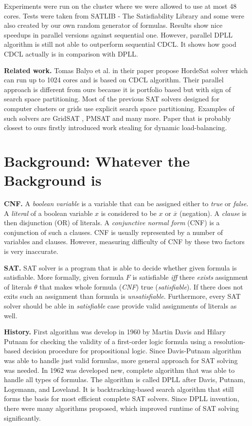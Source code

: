 \documentclass[letterpaper]{article}
\newcommand{\mypar}[1]{{\bf #1.}}
\begin{document}
Experiments were run on the cluster where we were allowed to use at most 48 cores. Tests were taken from SATLIB - The Satisfiability Library \cite{cnf_website} and some were also created by our own random generator of formulas. Results show nice speedups in parallel versions against sequential one. However, parallel DPLL algorithm is still not able to outperform sequential CDCL. It shows how good CDCL actually is in comparison with DPLL. 

\mypar{Related work} Tomas Balyo et al. in their paper \cite{hordesat} propose HordeSat solver which can run up to 1024 cores and is based on CDCL algorithm. Their parallel approach is different from ours because it is portfolio based but with sign of search space partitioning. Most of the previous SAT solvers designed for computer clusters or grids use explicit search space partitioning. Examples of such solvers are GridSAT \cite{gridsat}, PMSAT \cite{pmsat} and many more. Paper that is probably closest to ours \cite{stealing} firstly introduced work stealing for dynamic load-balancing. 

\section{Background: Whatever the Background is}\label{sec:background}

\mypar{CNF} A \textit{boolean variable} is a variable that can be assigned either to \textit{true} or \textit{false}. A \textit{literal} of a boolean variable $x$ is considered to be $x$ or $\overline{x}$ (negation). A \textit{clause} is then disjunction (OR) of literals. A \textit{conjunctive normal form} (CNF) is a conjunction of such a clauses. CNF is usually represented by a number of variables and clauses.  However, measuring difficulty of CNF by these two factors is very inaccurate.  

\mypar{SAT} SAT solver is a program that is able to decide whether given formula is satisfiable. More formally, given formula $F$ is satisfiable \textit{iff} there \textit{exists} assignment of literals $\theta$ that makes whole formula (\textit{CNF}) true (\textit{satisfiable}). If there does not exits such an assignment than formula is \textit{unsatisfiable}. Furthermore, every SAT solver should be able in \textit{satisfiable} case provide valid assignments of literals as well. 

\mypar{History} First algorithm was develop in 1960 by Martin Davis and Hilary Putnam \cite{dp} for checking the validity of a first-order logic formula using a resolution-based decision procedure for propositional logic. Since Davis-Putnam algorithm was able to handle just valid formulas, more general approach for SAT solving was needed. In 1962 was developed new, complete algorithm that was able to handle all types of formulas. The algorithm is called DPLL \cite{dpll} after Davis, Putnam, Logemann, and Loveland. It is backtracking-based search algorithm that still forms the basis for most efficient complete SAT solvers. Since DPLL invention, there were many algorithms proposed, which improved runtime of SAT solving significantly.
\end{document}
